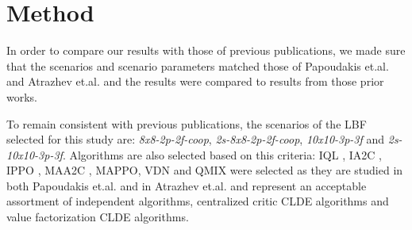 \documentclass[systems,article,submit,pdftex,moreauthors]{Definitions/mdpi}
\begin{document}


\section{Method}
\label{sec:Method}


In order to compare our results with those of previous publications, we made sure that the scenarios and scenario parameters matched those of  Papoudakis et.al. \cite{DBLP:Benchmarking} and Atrazhev et.al. \cite{atrazhev2022investigating} and the results were compared to results from those prior works. 

To remain consistent with previous publications, the scenarios of the LBF selected for this study are: \textit{8x8-2p-2f-coop}, \textit{2s-8x8-2p-2f-coop}, \textit{10x10-3p-3f} and \textit{2s-10x10-3p-3f}. Algorithms are also selected based on this criteria: IQL \cite{mnih2015dqn}, IA2C \cite{DBLP:A3C}, IPPO \cite{DBLP:ppo}, MAA2C \cite{DBLP:Benchmarking}, MAPPO\cite{DBLP:MAPPO}, VDN \cite{sunehag2017vdn} and QMIX \cite{DBLP:Qmix} were selected as they are studied in both Papoudakis et.al. \cite{DBLP:Benchmarking} and in Atrazhev et.al. \cite{atrazhev2022investigating} and represent an acceptable assortment of independent algorithms, centralized critic CLDE algorithms and value factorization CLDE algorithms.  
\end{document}
